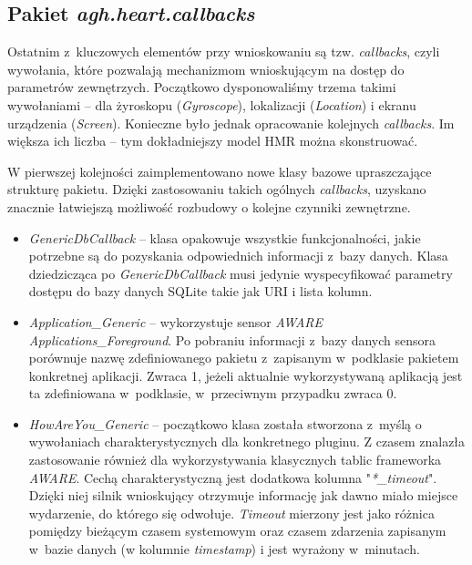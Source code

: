 \subsection{Pakiet \textit{agh.heart.callbacks}}

Ostatnim z~kluczowych elementów przy wnioskowaniu są tzw. \textit{callbacks}, czyli wywołania, które pozwalają mechanizmom wnioskującym na dostęp do parametrów zewnętrzych. Początkowo dysponowaliśmy trzema takimi wywołaniami -- dla żyroskopu (\textit{Gyroscope}), lokalizacji (\textit{Location}) i ekranu urządzenia (\textit{Screen}). Konieczne było jednak opracowanie kolejnych \textit{callbacks}. Im większa ich liczba -- tym dokładniejszy model HMR można skonstruować. 

W pierwszej kolejności zaimplementowano nowe klasy bazowe upraszczające strukturę pakietu. Dzięki zastosowaniu takich ogólnych \textit{callbacks}, uzyskano znacznie łatwiejszą możliwość rozbudowy o kolejne czynniki zewnętrzne.
\begin{itemize}
	\item \textit{GenericDbCallback} -- klasa opakowuje wszystkie funkcjonalności, jakie potrzebne są do pozyskania odpowiednich informacji z~bazy danych. Klasa dziedzicząca po \textit{GenericDbCallback} musi jedynie wyspecyfikować parametry dostępu do bazy danych SQLite takie jak URI i lista kolumn.
	
	\item \textit{Application\_Generic} -- wykorzystuje sensor \textit{AWARE} \textit{Applications\_Foreground}. Po pobraniu informacji z~bazy danych sensora porównuje nazwę zdefiniowanego pakietu z~zapisanym w~podklasie pakietem konkretnej aplikacji. Zwraca 1, jeżeli aktualnie wykorzystywaną aplikacją jest ta zdefiniowana w~podklasie, w~przeciwnym przypadku zwraca 0.
	
	\item \textit{HowAreYou\_Generic} -- początkowo klasa została stworzona z~myślą o wywołaniach charakterystycznych dla konkretnego pluginu. Z czasem znalazła zastosowanie również dla wykorzystywania klasycznych tablic frameworka \textit{AWARE}. Cechą charakterystyczną jest dodatkowa kolumna "\textit{*\_timeout}". Dzięki niej silnik wnioskujący otrzymuje informację jak dawno miało miejsce wydarzenie, do którego się odwołuje. \textit{Timeout} mierzony jest jako różnica pomiędzy bieżącym czasem systemowym oraz czasem zdarzenia zapisanym w~bazie danych (w kolumnie \textit{timestamp}) i jest wyrażony w~minutach.
\end{itemize}

